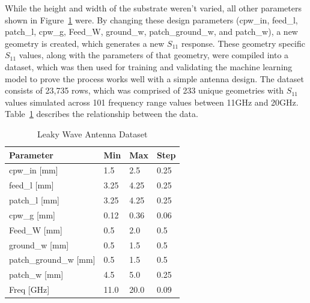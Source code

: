 \documentclass[conference]{IEEEtran}
\begin{document}
While the height and width of the substrate weren't varied, all other parameters shown in Figure~\ref{antenna_dataset} were. By changing these design parameters (cpw\_in, feed\_l, patch\_l, cpw\_g, Feed\_W, ground\_w, patch\_ground\_w, and patch\_w), a new geometry is created, which generates a new $S_{11}$ response. These geometry specific $S_{11}$ values, along with the parameters of that geometry, were compiled into a dataset, which was then used for training and validating the machine learning model to prove the process works well with a simple antenna design. The dataset consists of 23,735 rows, which was comprised of 233 unique geometries with $S_{11}$ values simulated across 101 frequency range values between 11GHz and 20GHz. Table~\ref{antenna_dataset} describes the relationship between the data.


\begin{table}[h]
\caption{Leaky Wave Antenna Dataset}
\begin{center}
\begin{tabular}{ |l|l|l|l| }
    \hline
    Parameter & Min & Max & Step \\ 
    \hline
    cpw\_in [mm] & 1.5 & 2.5 & 0.25 \\
    \hline
    feed\_l [mm] & 3.25 & 4.25 & 0.25 \\
    \hline
    patch\_l [mm] & 3.25 & 4.25 & 0.25 \\
    \hline
    cpw\_g [mm] & 0.12 & 0.36 & 0.06 \\
    \hline
    Feed\_W [mm] & 0.5 & 2.0 & 0.5 \\
    \hline
    ground\_w [mm] & 0.5 & 1.5 & 0.5 \\
    \hline
    patch\_ground\_w [mm] & 0.5 & 1.5 & 0.5 \\
    \hline
    patch\_w [mm] & 4.5 & 5.0 & 0.25 \\
    \hline
    Freq [GHz] & 11.0 & 20.0 & 0.09 \\
    \hline
\end{tabular}
\end{center}
\label{antenna_dataset}
\end{table}
\end{document}
